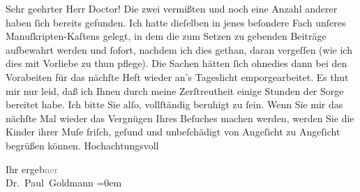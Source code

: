 \pstart\center{}Sehr geehrter Herr Doctor!\pend\vspace{0.5em}
\pstart
           Die zwei vermißten \label{K_L02640-1v}\label{K_L02640-1} und noch eine Anzahl anderer haben ſich bereits
               gefunden. Ich hatte dieſelben in jenes beſondere Fach unſeres Manuſkripten-Kaſtens
               gelegt, in dem die zum Setzen zu gebenden Beiträge aufbewahrt werden und ſofort,
               nachdem ich dies gethan, daran vergeſſen (wie ich dies mit {\pb}Vorliebe zu thun pflege). Die Sachen hätten ſich
               ohnedies dann bei den Vorabeiten für das nächſte Heft wieder an’s Tageslicht emporgearbeitet. Es
               thut mir nur leid, daß ich Ihnen durch meine Zerſtreutheit einige Stunden der Sorge
               bereitet habe. Ich bitte Sie alſo, vollſtändig beruhigt \introOben{}zu\introOben{}
               ſein. Wenn Sie mir das nächſte Mal wieder das Vergnügen Ihres Beſuches machen werden,
               werden Sie die Kinder ihrer
                  Muſe friſch, geſund und unbeſchädigt von Angeſicht zu Angeſicht begrüßen
               können. Hochachtungsvoll\pend
           
\pstart
           Ihr ergeb\textcolor{gray}{ner}{\\[\baselineskip]}\spacefill\mbox{Dr. Paul Goldmann}\pend
           \leftskip=0em{}\endnumbering{}  
      